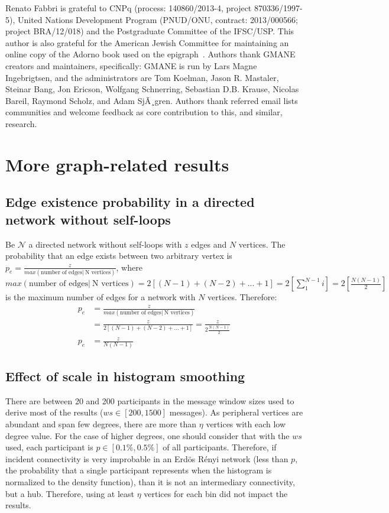 \documentclass[%
 aip,
 jmp,%
 amsmath,amssymb,
 reprint,%
]{revtex4-1}
\begin{document}
\begin{acknowledgments}
Renato Fabbri is grateful to CNPq (process: 140860/2013-4,
project 870336/1997-5), United Nations Development Program (PNUD/ONU, contract: 2013/000566; project BRA/12/018)  and 
the Postgraduate Committee of the IFSC/USP. This author is also grateful for
the American Jewish Committee for maintaining an online copy of the Adorno book
used on the epigraph~\cite{adorno}. Authors thank GMANE creators and maintainers, specifically: GMANE is run by Lars Magne Ingebrigtsen, and the administrators are Tom Koelman, Jason R. Mastaler, Steinar Bang, Jon Ericson, Wolfgang Schnerring, Sebastian D.B. Krause, Nicolas Bareil, Raymond Scholz, and Adam SjÃ¸gren. Authors thank referred email lists communities and welcome feedback as core contribution to this, and similar, research.
\end{acknowledgments}


\appendix
\section{More graph-related results}
\subsection{Edge existence probability in a directed network without self-loops}\label{ap:ded}
Be $\mathcal{N}$ a directed network without self-loops with $z$ edges and $N$ vertices. The probability that an edge exists between two arbitrary vertex is $p_e=\frac{z}{max( \text{number of edges} |\ \text{N vertices})}$, where $max( \text{number of edges} |\ \text{N vertices})=2[(N-1)+(N-2)+...+1]=2[\sum_1^{N-1}i]=2[\frac{N(N-1)}{2}]$ is the maximum number of edges for a network with $N$ vertices. Therefore:
\begin{align}
    p_e&=\frac{z}{max( \text{number of edges} |\ \text{N vertices})} \nonumber \\
       &=\frac{z}{2[(N-1)+(N-2)+...+1]}=\frac{z}{2\frac{N(N-1)}{2}} \nonumber \\
   p_e &=\frac{z}{N(N-1)}
\end{align}

\subsection{Effect of scale in histogram smoothing}\label{ap:ded2}
There are between 20 and 200 participants in the message window sizes used to derive most of the results ($ws \in [200,1500]$ messages). As peripheral vertices are abundant and span few degrees, there are more than $\eta$ vertices with each low degree value. For the case of higher degrees, one should consider that with the $ws$ used, each participant is $p \in [0.1\%,0.5\%]$ of all participants. Therefore, if incident connectivity is very improbable in an Erd\"os R\'enyi network (less than $p$, the probability that a single participant represents when the histogram is normalized to the density function), than it is not an intermediary connectivity, but a hub. Therefore, using at least $\eta$ vertices for each bin did not impact the results.
\end{document}
